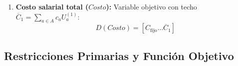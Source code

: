 \begin{enumerate}
\begin{align}
        D(ini_a) &= [0 \dots D_{\text{total}} - D^{\min}_a], &
        D(fin_a) &= [D^{\min}_a \dots D_{\text{total}}] \nonumber \\
        D(tiempo_a) &= [D^{\min}_a \dots U^{(1)}_a], &
        D(espera_a) &= [0 \dots U^{(1)}_a - D^{\min}_a]
        \label{eq:dom_tiempo_espera}
    \end{align}
    \item \textbf{Costo salarial total ($Costo$):} Variable objetivo con techo $\overline{C}_1 = \sum_{a \in A} c_a U^{(1)}_a$:
    \begin{equation}
        D(Costo) = [C_{\text{fijo}} \dots \overline{C}_1]
        \label{eq:dom_costo_p1}
    \end{equation}
\end{enumerate}

\subsection{Restricciones Primarias y Función Objetivo}

